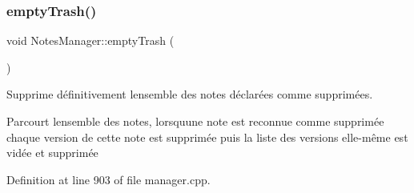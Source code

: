 \subsubsection{\texorpdfstring{empty\+Trash()}{emptyTrash()}}
{\footnotesize\ttfamily void Notes\+Manager\+::empty\+Trash (\begin{DoxyParamCaption}{ }\end{DoxyParamCaption})}



Supprime définitivement l\textquotesingle{}ensemble des notes déclarées comme supprimées. 

Parcourt l\textquotesingle{}ensemble des notes, lorsqu\textquotesingle{}une note est reconnue comme supprimée chaque version de cette note est supprimée puis la liste des versions elle-\/même est vidée et supprimée 

Definition at line 903 of file manager.\+cpp.

